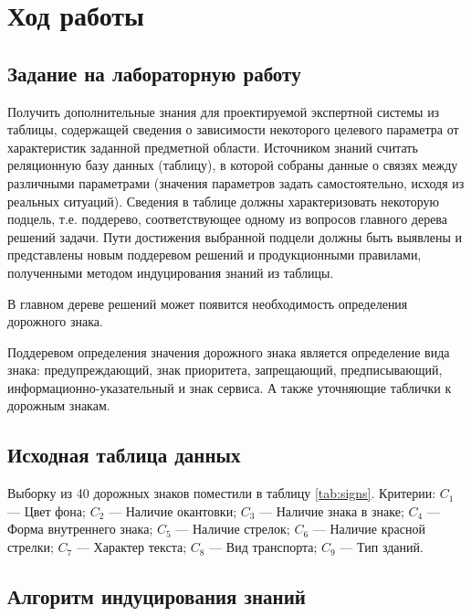 \chapter{Ход работы}

\section{Задание на лабораторную работу}

Получить дополнительные знания для проектируемой
экспертной системы из таблицы, содержащей сведения о
зависимости некоторого целевого параметра от характеристик
заданной предметной области. Источником знаний считать
реляционную базу данных (таблицу), в которой собраны данные о
связях между различными параметрами (значения параметров задать
самостоятельно, исходя из реальных ситуаций). Сведения в таблице
должны характеризовать некоторую подцель, т.е. поддерево,
соответствующее одному из вопросов главного дерева решений
задачи. Пути достижения выбранной подцели должны быть
выявлены и представлены новым поддеревом решений и
продукционными правилами, полученными методом индуцирования
знаний из таблицы.

В главном дереве решений может появится необходимость определения дорожного знака. %

Поддеревом определения значения дорожного знака является определение вида знака: предупреждающий, знак приоритета, запрещающий, предписывающий, информационно-указательный и знак сервиса. А также уточняющие таблички к дорожным знакам.

\section{Исходная таблица данных}

Выборку из 40 дорожных знаков поместили в таблицу \ref{tab:signs}. Критерии: $C_1$ --- Цвет фона; $C_2$ --- Наличие окантовки; $C_3$ --- Наличие знака в знаке; $C_4$ --- Форма внутреннего знака; $C_5$ --- Наличие стрелок; $C_6$ --- Наличие красной стрелки; $C_7$ --- Характер текста; $C_8$ --- Вид транспорта; $C_9$ --- Тип зданий.

\begin{landscape}

\end{landscape}

\section{Алгоритм индуцирования знаний}

